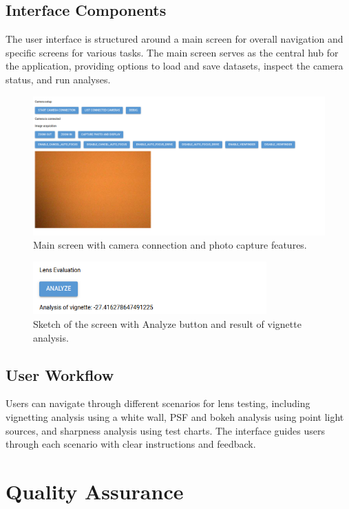\subsection{Interface Components}
The user interface is structured around a main screen for overall navigation and specific screens for various tasks. The main screen serves as the central hub for the application, providing options to load and save datasets, inspect the camera status, and run analyses.

\begin{figure}[h]
\centering
\includegraphics[width=1\textwidth]{Images/ui1.png}
\caption{Main screen with camera connection and photo capture features.}
\label{fig:ui_main_screen}
\end{figure}

\begin{figure}[h]
\centering
\includegraphics[width=0.8\textwidth]{Images/ui2.png}
\caption{Sketch of the screen with Analyze button and result of vignette analysis.}
\label{fig:ui_analysis_screen}
\end{figure}

\subsection{User Workflow}
Users can navigate through different scenarios for lens testing, including vignetting analysis using a white wall, PSF and bokeh analysis using point light sources, and sharpness analysis using test charts. The interface guides users through each scenario with clear instructions and feedback.

\section{Quality Assurance}

